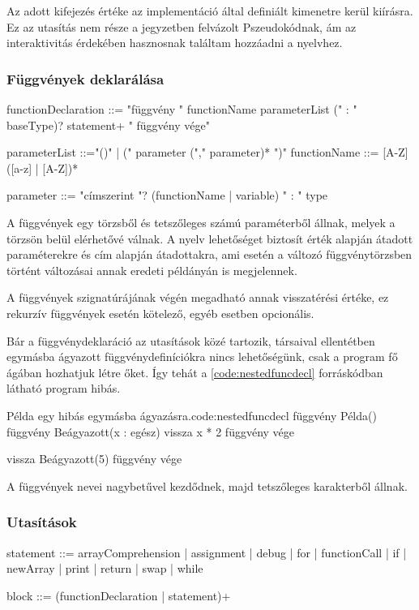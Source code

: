 Az adott kifejezés értéke az implementáció által definiált kimenetre kerül kiírásra. Ez az utasítás nem része a jegyzetben felvázolt Pszeudokódnak, ám az interaktivitás érdekében hasznosnak találtam hozzáadni a nyelvhez.

\subsubsection{Függvények deklarálása}
\label{sec:funcdecl}

\begin{ebnf}
functionDeclaration ::= 
    "függvény " functionName parameterList (" : " baseType)?
        statement+ 
    " függvény vége"

parameterList ::="()" | (" parameter ("," parameter)* ")"
functionName ::= [A-Z] ([a-z] | [A-Z])*

parameter ::=
    "címszerint "? (functionName | variable) " : " type
\end{ebnf}

A függvények egy törzsből és tetszőleges számú paraméterből állnak, melyek a törzsön belül elérhetővé válnak. A nyelv lehetőséget biztosít érték alapján átadott paraméterekre és cím alapján átadottakra, ami esetén a változó függvénytörzsben történt változásai annak eredeti példányán is megjelennek.

A függvények szignatúrájának végén megadható annak visszatérési értéke, ez rekurzív függvények esetén kötelező, egyéb esetben opcionális.

Bár a függvénydeklaráció az utasítások közé tartozik, társaival ellentétben egymásba ágyazott függvénydefiníciókra nincs lehetőségünk, csak a program fő ágában hozhatjuk létre őket. Így tehát a \ref{code:nestedfuncdecl} forráskódban látható program hibás.

\begin{code}{Példa egy hibás egymásba ágyazásra.}{code:nestedfuncdecl}
függvény Példa()
    függvény Beágyazott(x : egész)
        vissza x * 2
    függvény vége

    vissza Beágyazott(5)
függvény vége
\end{code}

A függvények nevei nagybetűvel kezdődnek, majd tetszőleges karakterből állnak.

\subsubsection{Utasítások}

\begin{ebnf}
statement ::= arrayComprehension 
    | assignment 
    | debug 
    | for 
    | functionCall 
    | if 
    | newArray 
    | print 
    | return 
    | swap 
    | while

block ::= (functionDeclaration | statement)+
\end{ebnf}

